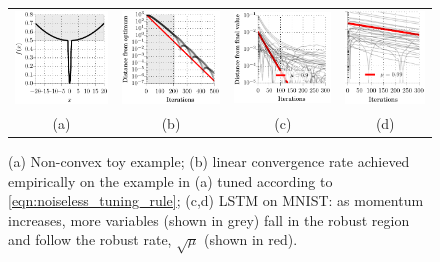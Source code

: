 \documentclass{article} %
\begin{document}
\begin{figure}[t]
\centering
\vspace{-2em}
\begin{tabular}{c c c c}
  \includegraphics[width=0.23\linewidth]{figures/non_convex_toy} &
  \includegraphics[width=0.24\linewidth]{figures/non_convex_constant_rate} &
  \includegraphics[width=0.24\linewidth]{figures/constant_rate_09} &
  \includegraphics[width=0.19\linewidth]{figures/constant_rate_099} \\
  (a) & (b) & (c) &(d)
\end{tabular}
\caption{(a) Non-convex toy example;
(b) linear convergence rate achieved empirically on the example in (a) tuned according to \eqref{eqn:noiseless_tuning_rule};
(c,d)
LSTM on MNIST: as momentum increases, more variables (shown in grey) fall in the robust region and follow the robust rate, $\sqrt{\mu}$ (shown in red).}
\label{fig:curvature_robustness}
\end{figure}












\end{document}
